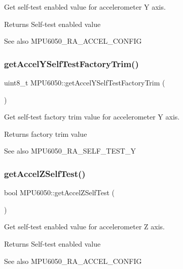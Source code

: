 Get self-\/test enabled value for accelerometer Y axis. \begin{DoxyReturn}{Returns}
Self-\/test enabled value 
\end{DoxyReturn}
\begin{DoxySeeAlso}{See also}
M\+P\+U6050\+\_\+\+R\+A\+\_\+\+A\+C\+C\+E\+L\+\_\+\+C\+O\+N\+F\+IG 
\end{DoxySeeAlso}
\mbox{\label{class_m_p_u6050_ae219dc9651d4d42a918e553b03e4e7bf}} 
\subsubsection{\texorpdfstring{getAccelYSelfTestFactoryTrim()}{getAccelYSelfTestFactoryTrim()}}
{\footnotesize\ttfamily uint8\+\_\+t M\+P\+U6050\+::get\+Accel\+Y\+Self\+Test\+Factory\+Trim (\begin{DoxyParamCaption}{ }\end{DoxyParamCaption})}

Get self-\/test factory trim value for accelerometer Y axis. \begin{DoxyReturn}{Returns}
factory trim value 
\end{DoxyReturn}
\begin{DoxySeeAlso}{See also}
M\+P\+U6050\+\_\+\+R\+A\+\_\+\+S\+E\+L\+F\+\_\+\+T\+E\+S\+T\+\_\+Y 
\end{DoxySeeAlso}
\mbox{\label{class_m_p_u6050_a57710638eeb6176cf14a8c444bda5300}} 
\subsubsection{\texorpdfstring{getAccelZSelfTest()}{getAccelZSelfTest()}}
{\footnotesize\ttfamily bool M\+P\+U6050\+::get\+Accel\+Z\+Self\+Test (\begin{DoxyParamCaption}{ }\end{DoxyParamCaption})}

Get self-\/test enabled value for accelerometer Z axis. \begin{DoxyReturn}{Returns}
Self-\/test enabled value 
\end{DoxyReturn}
\begin{DoxySeeAlso}{See also}
M\+P\+U6050\+\_\+\+R\+A\+\_\+\+A\+C\+C\+E\+L\+\_\+\+C\+O\+N\+F\+IG 
\end{DoxySeeAlso}
\mbox{\label{class_m_p_u6050_a455f63be2ea810cac26d583da6915050}} 
